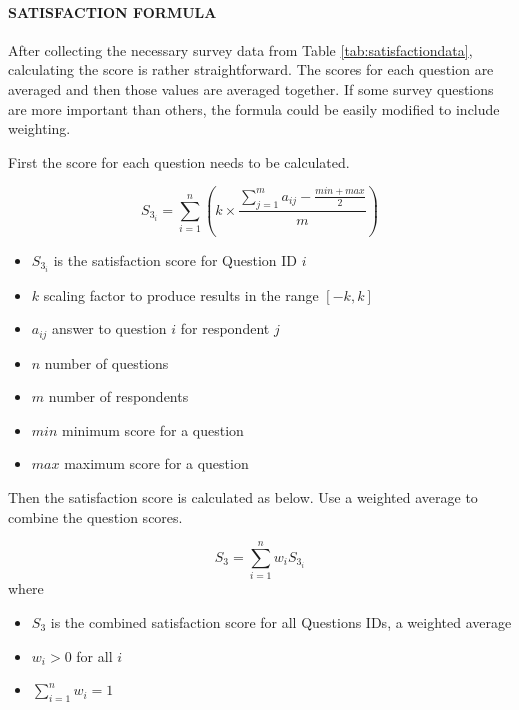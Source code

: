 \documentclass[SDSUThesis.tex]{subfiles}
\begin{document}
            \paragraph{SATISFACTION FORMULA}
                After collecting the necessary survey data from Table \ref{tab:satisfactiondata},
                calculating the score is rather straightforward.
                The scores for each question are averaged and then those
                values are averaged together.  If some survey questions
                are more important than others, the formula could be
                easily modified to include weighting.  
            
                First the score for each question needs to be calculated.
                
                \[
                    S_{3_i} = \sum^n_{i=1}\left( k \times \frac{ \sum^m_{j=1}a_{ij}-\frac{min + max}{2}}{m} \right)
                \]
                
                \begin{itemize}
                    \item $S_{3_i}$ is the satisfaction score for Question ID $i$
                    \item $k$ scaling factor to produce results in the range $[-k,k]$
                    \item $a_{ij}$ answer to question $i$ for respondent $j$
                    \item $n$ number of questions
                    \item $m$ number of respondents
                    \item $min$ minimum score for a question
                    \item $max$ maximum score for a question
                \end{itemize}
                
                Then the satisfaction score is calculated as below.  Use a weighted average
                to combine the question scores.
                
                \[
                    S_{3} = \sum\limits^n_{i=1} w_i S_{3_i}
                \]
                where
                \begin{itemize}
                    \item $S_3$ is the combined satisfaction score for all Questions IDs, 
                    a weighted average
                    \item $w_i > 0$ for all $i$
                    \item $\sum\limits^n_{i=1} w_i = 1$
                \end{itemize}
                
\end{document}
